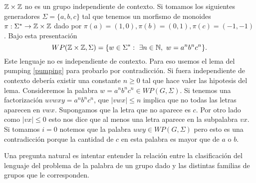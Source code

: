 \documentclass[tesis.tex]{subfiles}
\newcommand{\ic}{independiente de contexto }
\begin{document}
\begin{ej}
	$\mathbb Z \times \mathbb Z$ no es un grupo independiente de contexto.
	Si tomamos los siguientes generadores $\Sigma = \{ a,b,c \}$ tal que tenemos un morfismo de monoides $\pi: \Sigma^* \to \mathbb Z \times \mathbb Z$ dado por $\pi(a)=(1,0), \pi(b)=(0,1), \pi(c)=(-1,-1)$.
	Bajo esta presentación 
	\[
	WP(\mathbb Z \times \mathbb Z, \Sigma) = \{ w \in \Sigma^*  : \ \exists n \in \mathbb N, \ w = a^nb^nc^n  \}.
	\]
	Este lenguaje no es independiente de contexto.
	Para eso usemos el lema del pumping \ref{pumping} para probarlo por contradicción.
	Si fuera \ic debería existir una constante $n \ge 0$ tal que hace valer las hipotesis del lema.
	Consideremos la palabra $w = a^n b^n c^n \in WP(G, \Sigma)$.
	Si tenemos una factorización $uvwxy = a^nb^nc^n$, que $|vwx| \le n$ implica que no todas las letras aparecen en $vwx$.
	Supongamos que la letra que no aparece es $c$.
	Por otro lado como $|vx| \le 0$ esto nos dice que al menos una letra aparece en la subpalabra $vx$.
	Si tomamos $i=0$ notemos que la palabra $uwy \in WP(G,\Sigma)$ pero esto es una contradicción porque la cantidad de $c$ en esta palabra es mayor que de $a$ o $b$.
\end{ej}

Una pregunta natural es intentar entender la relación entre la clasificación del lenguaje del problema de la palabra de un grupo dado y las distintas familias de grupos que le corresponden. 

\end{document}
